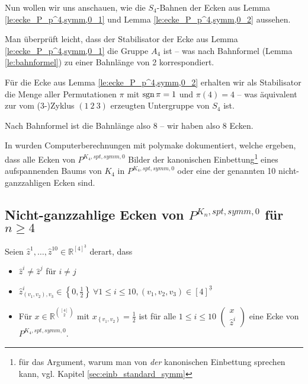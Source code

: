 \documentclass[10p,a4paper,BCOR = 12mm, DIV=15]{scrbook}
\begin{document}
Nun wollen wir uns anschauen, wie die $S_4$-Bahnen der Ecken aus Lemma \ref{le:ecke_P_p^4,symm,0_1} und Lemma \ref{le:ecke_P_p^4,symm,0_2} aussehen.

Man überprüft leicht, dass der Stabilisator der Ecke aus Lemma \ref{le:ecke_P_p^4,symm,0_1} die Gruppe $A_4$ ist -- was nach Bahnformel (Lemma \ref{le:bahnformel}) zu einer Bahnlänge von 2 korrespondiert.

Für die Ecke aus Lemma \ref{le:ecke_P_p^4,symm,0_2} erhalten wir als Stabilisator die Menge aller Permutationen $\pi$ mit $\operatorname{sgn} \pi = 1$ und $\pi(4)=4$ -- was äquivalent zur vom (3-)Zyklus $\left(1\ 2\ 3\right)$ erzeugten Untergruppe von $S_4$ ist.

Nach Bahnformel ist die Bahnlänge also 8 -- wir haben also 8 Ecken.

In \citep{sorgatz2011} wurden Computerberechnungen mit polymake \cite{polymake} dokumentiert, welche ergeben, dass alle Ecken von $P^{K_4, spt, symm, 0}$ Bilder der kanonischen Einbettung\footnote{für das Argument, warum man von \emph{der} kanonischen Einbettung sprechen kann, vgl. Kapitel \ref{sec:einb_standard_symm}} eines aufspannenden Baums von $K_4$ in $P^{K_4, spt, symm, 0}$ oder eine der genannten 10 nicht-ganzzahligen Ecken sind.

\subsection{Nicht-ganzzahlige Ecken von $P^{K_n, spt, symm, 0}$ für $n\geq 4$}

\begin{Def}
\label{def:nichtganzz_ecken}
Seien $\widehat{z}^1, \ldots, \widehat{z}^{10}\in \mathbb{R}^{[4]^{\underline{3}}}$ derart, dass
\begin{itemize}
\item $\widehat{z}^i \neq \widehat{z}^j$ für $i\neq j$
\item $\widehat{z}^i_{\left(v_1, v_2\right), v_3} \in \left\{0, \frac{1}{2}\right\}\ \forall 1 \leq i \leq 10, \left(v_1, v_2, v_3\right) \in [4]^{\underline{3}}$
\item Für $x\in \mathbb{R}^{[4]\choose 2}$ mit $x_{\left\{v_1, v_2\right\}} = \frac{1}{2}$ ist für alle $1\leq i \leq 10$ $\left(
\begin{array}{c}
x \\
\widehat{z}^i
\end{array}
\right)$ eine Ecke von $P^{K_4, spt, symm, 0}$.
\end{itemize}
\end{Def}
\end{document}
